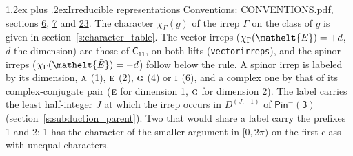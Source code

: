 \documentclass[10pt,a4paper]{article}
\makeatletter
\renewcommand\section{\@startsection{section}{1}{\z@}{-3ex plus -1ex minus -.2ex}%
  {1.2ex plus .2ex}{\normalfont\large\sffamily\bfseries\color{parttitle}}}
\numberwithin{equation}{section}
\newcommand{\eltfont}[1]{{\let\sigma\eltsigma\mathelt{#1}}}
\newcommand{\grp}[1]{\mathsf{#1}}
\newcommand{\irr}[1]{\text{\normalfont\scshape #1}}
\newcommand{\elt}[1]{\eltfont{#1}}
\newcommand{\irrJp}[2]{D^{(#1,#2)}}
\newcommand{\irchar}[1]{\chi_{#1}}
\newcommand{\barred}[1]{\bar{#1}}
\makeatother
\begin{document}
\section{Irreducible representations}\label{s:irreps}
Conventions: \href{../../CONVENTIONS.pdf}{CONVENTIONS.pdf}, sections \href{../../../rotation/CONVENTIONS.pdf\#conv.6}{6}, \href{../../../rotation/CONVENTIONS.pdf\#conv.7}{7} and \href{../../CONVENTIONS.pdf\#conv.23}{23}.
\leavevmode\label{n:function.character}\label{n:irrep.Gamma}The character $\irchar{\Gamma}(g)$ of the irrep $\Gamma$ on the class of $g$ is given in section~\ref{s:character_table}. \label{n:index.dimension}The vector irreps ($\irchar{\Gamma}(\elt{\barred{E}}) = +d$, $d$ the dimension) are those of \href{../../../rotation/data/pdf/C11.pdf}{$\grp{C_{11}}$}, on both lifts (\texttt{vectorirreps}), and the spinor irreps ($\irchar{\Gamma}(\elt{\barred{E}}) = -d$) follow below the rule. A spinor irrep is labeled by its dimension, $\irr{a}$ (1), $\irr{e}$ (2), $\irr{g}$ (4) or $\irr{i}$ (6), and a complex one by that of its complex-conjugate pair ($\irr{e}$ for dimension 1, $\irr{g}$ for dimension 2). The label carries the least half-integer $J$ at which the irrep occurs in $\irrJp{J}{+1}$ of $\grp{Pin^{-}(3)}$ (section~\ref{s:subduction_parent}). Two that would share a label carry the prefixes 1 and 2: 1 has the character of the smaller argument in $[0, 2\pi)$ on the first class with unequal characters.
\end{document}
